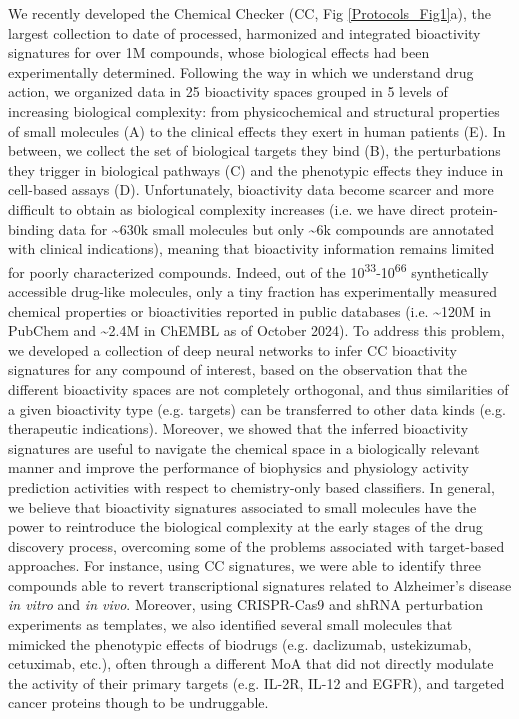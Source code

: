 We recently developed the Chemical Checker (CC, Fig \ref{Protocols_Fig1}a), the largest collection to date of processed, harmonized and integrated bioactivity signatures for over 1M compounds, whose biological effects had been experimentally determined\cite{duran-frigola_extending_2020}. Following the way in which we understand drug action, we organized data in 25 bioactivity spaces grouped in 5 levels of increasing biological complexity: from physicochemical and structural properties of small molecules (A) to the clinical effects they exert in human patients (E). In between, we collect the set of biological targets they bind (B), the perturbations they trigger in biological pathways (C) and the phenotypic effects they induce in cell-based assays (D). Unfortunately, bioactivity data become scarcer and more difficult to obtain as biological complexity increases (i.e. we have direct protein-binding data for \textasciitilde630k small molecules but only \textasciitilde6k compounds are annotated with clinical indications), meaning that bioactivity information remains limited for poorly characterized compounds. Indeed, out of the 10\textsuperscript{33}-10\textsuperscript{66} synthetically accessible drug-like molecules\cite{polishchuk_estimation_2013, bohacek_art_1996}, only a tiny fraction has experimentally measured chemical properties or bioactivities reported in public databases (i.e. \textasciitilde120M in PubChem and \textasciitilde2.4M in ChEMBL as of October 2024). To address this problem, we developed a collection of deep neural networks to infer CC bioactivity signatures for any compound of interest\cite{bertoni_bioactivity_2021, comajuncosa-creus_stereochemically-aware_2024}, based on the observation that the different bioactivity spaces are not completely orthogonal, and thus similarities of a given bioactivity type (e.g. targets) can be transferred to other data kinds (e.g. therapeutic indications). Moreover, we showed that the inferred bioactivity signatures are useful to navigate the chemical space in a biologically relevant manner and improve the performance of biophysics and physiology activity prediction activities with respect to chemistry-only based classifiers\cite{bertoni_bioactivity_2021}. In general, we believe that bioactivity signatures associated to small molecules have the power to reintroduce the biological complexity at the early stages of the drug discovery process, overcoming some of the problems associated with target-based approaches. For instance, using CC signatures, we were able to identify three compounds able to revert transcriptional signatures related to Alzheimer’s disease \textit{in vitro} and \textit{in vivo}\cite{pauls_identification_2021}. Moreover, using CRISPR-Cas9 and shRNA perturbation experiments as templates, we also identified several small molecules that mimicked the phenotypic effects of biodrugs (e.g. daclizumab, ustekizumab, cetuximab, etc.), often through a different MoA that did not directly modulate the activity of their primary targets (e.g. IL-2R, IL-12 and EGFR)\cite{duran-frigola_extending_2020}, and targeted cancer proteins though to be undruggable\cite{bertoni_bioactivity_2021}.


